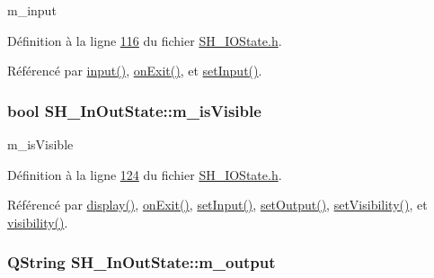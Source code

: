 m\-\_\-input 



Définition à la ligne \hyperlink{SH__IOState_8h_source_l00116}{116} du fichier \hyperlink{SH__IOState_8h_source}{S\-H\-\_\-\-I\-O\-State.\-h}.



Référencé par \hyperlink{classSH__InOutState_a8e1b78069343122df7713624a1a5a100}{input()}, \hyperlink{classSH__InOutState_afc0433d63375063a43e39adca641e330}{on\-Exit()}, et \hyperlink{classSH__InOutState_aaec9c2b5ef7c406bff7469461352d47c}{set\-Input()}.

\hypertarget{classSH__InOutState_a8fd66b185c9a55f0e84daa97e2acf53a}{
\subsubsection[{m\-\_\-is\-Visible}]{\setlength{\rightskip}{0pt plus 5cm}bool S\-H\-\_\-\-In\-Out\-State\-::m\-\_\-is\-Visible\hspace{0.3cm}{\ttfamily [private]}}}\label{classSH__InOutState_a8fd66b185c9a55f0e84daa97e2acf53a}


m\-\_\-is\-Visible 



Définition à la ligne \hyperlink{SH__IOState_8h_source_l00124}{124} du fichier \hyperlink{SH__IOState_8h_source}{S\-H\-\_\-\-I\-O\-State.\-h}.



Référencé par \hyperlink{classSH__InOutState_a616f88b20478b81b2927a9ddc2b4f521}{display()}, \hyperlink{classSH__InOutState_afc0433d63375063a43e39adca641e330}{on\-Exit()}, \hyperlink{classSH__InOutState_aaec9c2b5ef7c406bff7469461352d47c}{set\-Input()}, \hyperlink{classSH__InOutState_af611c84134e262739cd834797b315c80}{set\-Output()}, \hyperlink{classSH__InOutState_a7fdfaa6f600f0ac4a96f238a038ba9ad}{set\-Visibility()}, et \hyperlink{classSH__InOutState_a3a18752c4122c26a2ebf38310c9c1b75}{visibility()}.

\hypertarget{classSH__InOutState_ae735e741ce229d2600448d8daa0abc2d}{
\subsubsection[{m\-\_\-output}]{\setlength{\rightskip}{0pt plus 5cm}Q\-String S\-H\-\_\-\-In\-Out\-State\-::m\-\_\-output\hspace{0.3cm}{\ttfamily [private]}}}\label{classSH__InOutState_ae735e741ce229d2600448d8daa0abc2d}


